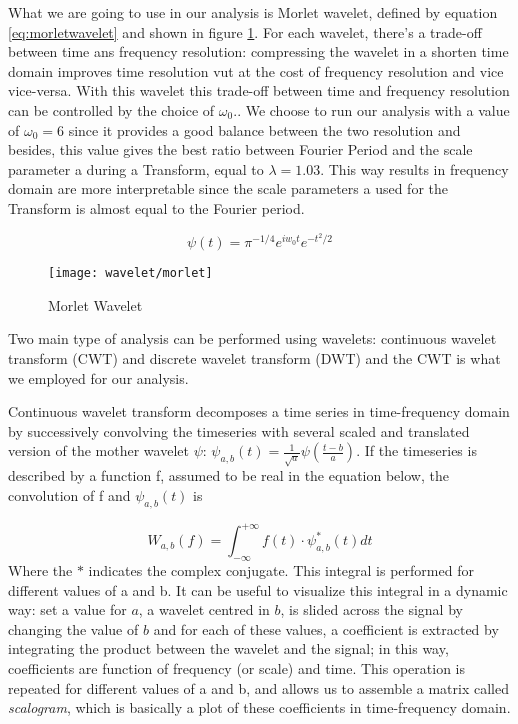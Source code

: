 \documentclass[10pt]{report}
\begin{document}
What we are going to use in our analysis is Morlet wavelet, defined by equation \ref{eq:morletwavelet} and shown in figure \ref{fig:wavelet_morlet}.
For each wavelet, there's a trade-off between time ans frequency resolution: compressing the wavelet in a shorten time domain improves time resolution vut at the cost of frequency resolution and vice vice-versa.
With this wavelet this trade-off between time and frequency resolution can be controlled by the choice of $\omega_0$.\cite{muller-2004}.
We choose to run our analysis with a value of $\omega_0 = 6$ since it provides a good balance between the two resolution \cite{grinsted-2004} and besides, this value gives the best ratio between Fourier Period and the scale parameter a during a Transform, equal to $\lambda = 1.03$.
This way results in frequency domain are more interpretable since the scale parameters a used for the Transform is almost equal to the Fourier period.


\begin{equation}\label{eq:morletwavelet}
\psi\left(t\right) = \pi^{-1/4}e^{iw_0 t}e^{-t^2/2}
\end{equation}

\begin{figure}[h]
\centering
\texttt{[image: wavelet/morlet]}
\caption{Morlet Wavelet}
\label{fig:wavelet_morlet}
\end{figure}

Two main type of analysis can be performed using wavelets: continuous wavelet transform (CWT) and discrete wavelet transform (DWT) and the CWT is what we employed for our analysis.

Continuous wavelet transform decomposes a time series in time-frequency domain by successively convolving the timeseries with several scaled and translated version of the mother wavelet $\psi$: $\psi_{a, b}\left(t\right) = \frac{1}{\sqrt{a}}\psi(\frac{t-b}{a})$.
If the timeseries is described by a function f, assumed to be real in the equation below, the convolution of f and $\psi_{a, b}\left(t\right)$ is

\begin{equation}
W_{a,b}(f) = \int_{-\infty}^{+\infty}  f(t) \cdot \psi_{a, b}^\ast \left(t\right)   dt
\end{equation}
Where the $\ast$ indicates the complex conjugate.
This integral is performed for different values of a and b.
It can be useful to visualize this integral in a dynamic way: set a value for $a$, a wavelet centred in $b$, is slided across the signal by changing the value of $b$ and for each of these values, a coefficient is extracted by integrating the product between the wavelet and the signal; in this way, coefficients are function of frequency (or scale) and time. This operation is repeated for different values of a and b, and allows us to assemble a matrix called \emph{scalogram}, which is basically a plot of these coefficients in time-frequency domain.
\end{document}
